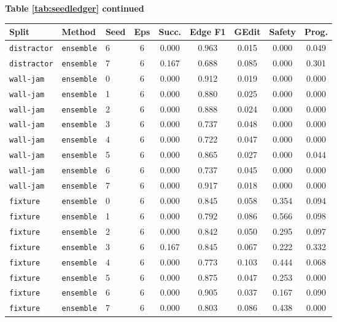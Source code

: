 \documentclass{article}
\begin{document}
\begin{center}
\textbf{Table \ref{tab:seedledger} continued}\\[0.4ex]
\begin{tabular}{lllcccccc}
\toprule
Split & Method & Seed & Eps & Succ. & Edge F1 & GEdit & Safety & Prog. \\
\midrule
\texttt{distractor} & \texttt{ensemble} & 6 & 6 & 0.000 & 0.963 & 0.015 & 0.000 & 0.049 \\
\texttt{distractor} & \texttt{ensemble} & 7 & 6 & 0.167 & 0.688 & 0.085 & 0.000 & 0.301 \\
\texttt{wall-jam} & \texttt{ensemble} & 0 & 6 & 0.000 & 0.912 & 0.019 & 0.000 & 0.000 \\
\texttt{wall-jam} & \texttt{ensemble} & 1 & 6 & 0.000 & 0.880 & 0.025 & 0.000 & 0.000 \\
\texttt{wall-jam} & \texttt{ensemble} & 2 & 6 & 0.000 & 0.888 & 0.024 & 0.000 & 0.000 \\
\texttt{wall-jam} & \texttt{ensemble} & 3 & 6 & 0.000 & 0.737 & 0.048 & 0.000 & 0.000 \\
\texttt{wall-jam} & \texttt{ensemble} & 4 & 6 & 0.000 & 0.722 & 0.047 & 0.000 & 0.000 \\
\texttt{wall-jam} & \texttt{ensemble} & 5 & 6 & 0.000 & 0.865 & 0.027 & 0.000 & 0.044 \\
\texttt{wall-jam} & \texttt{ensemble} & 6 & 6 & 0.000 & 0.737 & 0.045 & 0.000 & 0.000 \\
\texttt{wall-jam} & \texttt{ensemble} & 7 & 6 & 0.000 & 0.917 & 0.018 & 0.000 & 0.000 \\
\texttt{fixture} & \texttt{ensemble} & 0 & 6 & 0.000 & 0.845 & 0.058 & 0.354 & 0.094 \\
\texttt{fixture} & \texttt{ensemble} & 1 & 6 & 0.000 & 0.792 & 0.086 & 0.566 & 0.098 \\
\texttt{fixture} & \texttt{ensemble} & 2 & 6 & 0.000 & 0.842 & 0.050 & 0.295 & 0.097 \\
\texttt{fixture} & \texttt{ensemble} & 3 & 6 & 0.167 & 0.845 & 0.067 & 0.222 & 0.332 \\
\texttt{fixture} & \texttt{ensemble} & 4 & 6 & 0.000 & 0.773 & 0.103 & 0.444 & 0.068 \\
\texttt{fixture} & \texttt{ensemble} & 5 & 6 & 0.000 & 0.875 & 0.047 & 0.253 & 0.000 \\
\texttt{fixture} & \texttt{ensemble} & 6 & 6 & 0.000 & 0.905 & 0.037 & 0.167 & 0.090 \\
\texttt{fixture} & \texttt{ensemble} & 7 & 6 & 0.000 & 0.803 & 0.086 & 0.438 & 0.000 \\

\end{tabular}
\end{center}
\end{document}
